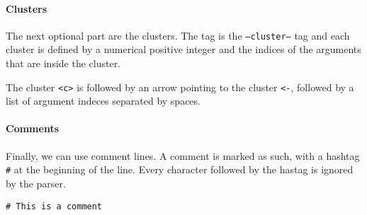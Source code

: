 \paragraph{Clusters} The next optional part are the clusters. The tag is the \texttt{--cluster--} tag and each cluster is defined by a numerical positive integer and the indices of the arguments that are inside the cluster.

\vspace{0.3cm}
\begin{center}
    \hspace{1cm}
\end{center}
\vspace{0.3cm}

The cluster \texttt{<c>} is followed by an arrow pointing to the cluster \texttt{<-}, followed by a list of argument indeces separated by spaces.

\paragraph{Comments} Finally, we can use comment lines. A comment is marked as such, with a hashtag \texttt{\#} at the beginning of the line. Every character followed by the hastag is ignored by the parser.

\vspace{0.3cm}
\begin{center}
    \texttt{\# This is a comment}
\end{center}
\vspace{0.3cm}


